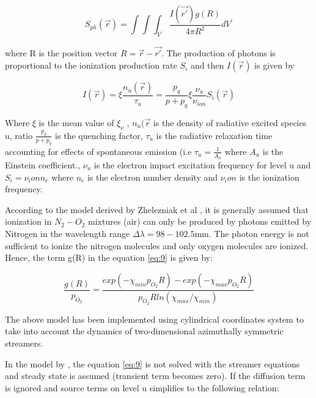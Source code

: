 \documentclass{article}
\begin{document}
\begin{equation} \label{eq:14}
S_{ph}(\vec{r}) = {\int\int\int_{V^'}} \frac{I(\vec{r'}) g(R)}{4 \pi {R^2}} d{V^'}
\end{equation} 

where R is the position vector $R= \vec{r}-\vec{r'}$. The production of photons is proportional to the ionization production rate $S_i$ and then $I(\vec{r})$ is given by 

\begin{equation}
I(\vec{r}) = \xi \frac{n_u(\vec{r})}{\tau_u}= \frac{p_q}{p+p_q} \xi \frac{\nu_u}{\nu_{ion}} S_i(\vec{r})
\end{equation} 

Where $\xi$ is the mean value of $\xi_\nu$ , $n_u(\vec{r}$ is the density of radiative excited species u, ratio $\frac{p_q}{p+p_q}$ is the quenching factor, $\tau_u$ is the radiative relaxation time accounting for effects of spontaneous emission (i.e $\tau_u = \frac{1}{A_u}$ where $A_u$ is the Einstein coefficient., $\nu_u$ is the electron impact excitation frequency for level u and $S_i=\nu_ion n_e$ where $n_e$ is the electron number density and $\nu_ion$ is the ionization frequency. 

According to the model derived by Zhelezniak et al \cite{ZhelezniakM.B.andMnatsakanianA.K.andSizykh1982PhotoionizationDischarge}, it is generally assumed that ionization in $N_2-O_2$ mixtures (air) can only be produced by photons emitted by Nitrogen in the wavelength range $\Delta \lambda = 98-102.5$mm. The photon energy is not sufficient to ionize the nitrogen molecules and only oxygen molecules are ionized. Hence, the term g(R) in the equation \ref{eq:9} is given by:

\begin{equation}
\frac{g(R)}{p_{O_2}} = \frac{exp(-\chi_{min} p_{O_2} R)- exp(-\chi_{max} p_{O_2} R)}{p_{O_2} R ln(\chi_{max} / \chi_{min})}
\end{equation} 

The above model has been implemented using cylindrical coordinates system to take into account the dynamics of two-dimensional azimuthally symmetric streamers.

In the model by \cite{ZhelezniakM.B.andMnatsakanianA.K.andSizykh1982PhotoionizationDischarge}, the equation \ref{eq:9} is not solved with the streamer equations and steady state is assumed (transient term becomes zero). If the diffusion term is ignored and source terms on level u simplifies to the following relation:
\end{document}
